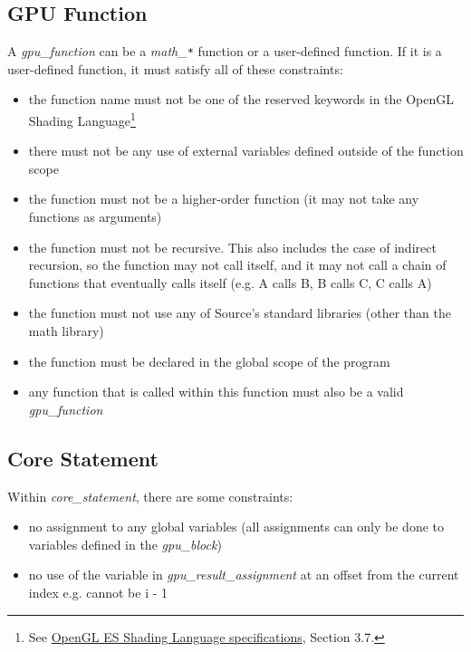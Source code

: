 \subsection*{GPU Function}

A \textit{gpu\_function} can be a \textit{math\_\texttt{*}} function or a user-defined function.
If it is a user-defined function, it must satisfy all of these constraints:

\begin{itemize}
    \item{the function name must not be one of the reserved keywords in the OpenGL Shading Language\footnote{See \href{ https://www.khronos.org/registry/OpenGL/specs/es/2.0/GLSL_ES_Specification_1.00.pdf}{OpenGL ES Shading Language specifications}, Section 3.7.}}
    \item{there must not be any use of external variables defined outside of the function scope}
    \item{the function must not be a higher-order function (it may not take any functions as arguments)}
    \item{the function must not be recursive. This also includes the case of indirect recursion, so the function may not call itself, and it may not call a chain of functions that eventually calls itself (e.g. A calls B, B calls C, C calls A)}
    \item{the function must not use any of Source's standard libraries (other than the math library)}
    \item{the function must be declared in the global scope of the program}
    \item{any function that is called within this function must also be a valid \textit{gpu\_function}}
\end{itemize}


\subsection*{Core Statement}

Within \textit{core\_statement}, there are some constraints:

\begin{itemize}
    \item{no assignment to any global variables (all assignments can only be done to variables defined in the \textit{gpu\_block}})
    \item{no use of the variable in \textit{gpu\_result\_assignment} at an offset from the current index e.g. cannot be i - 1}
\end{itemize}

